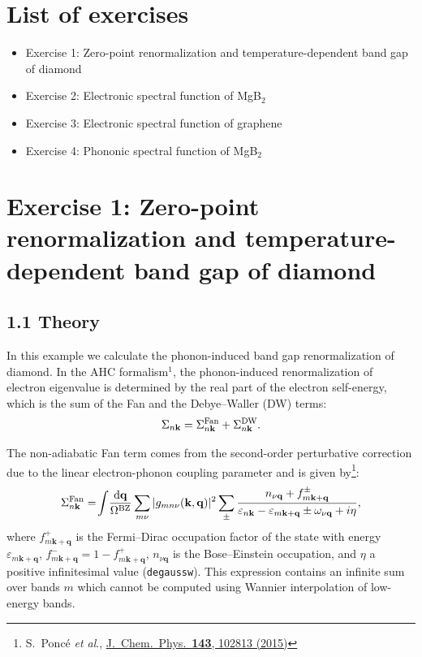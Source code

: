 \documentclass[a4paper,11pt,serif]{article}
\newcommand{\mb}[1]{\mathbf{#1}}
\begin{document}
\section*{List of exercises}
\begin{itemize}
   \item Exercise 1: Zero-point renormalization and temperature-dependent band gap of diamond
   \item Exercise 2: Electronic spectral function of MgB$_2$
   \item Exercise 3: Electronic spectral function of graphene
   \item Exercise 4: Phononic spectral function of MgB$_2$
\end{itemize}


\section*{Exercise 1: Zero-point renormalization and temperature-dependent band gap of diamond}

\subsection*{1.1 Theory}
In this example we calculate the phonon-induced band gap renormalization of diamond.
In the AHC formalism$^{1}$, the phonon-induced renormalization of electron eigenvalue is determined by the real part of the electron self-energy, which is the sum of the Fan and the Debye--Waller (DW) terms:
\begin{equation}
   \Sigma_{n\mb{k}} = \Sigma^{\rm Fan}_{n\mb{k}} + \Sigma^{\rm DW}_{n\mb{k}}.
\end{equation}


\vspace{0.5cm}
The non-adiabatic Fan term comes from the second-order perturbative correction due to the linear electron-phonon coupling parameter and is given by\footnote{S.\ Ponc\'e \textit{et al}., \href{https://pubs.aip.org/aip/jcp/article-abstract/143/10/102813/898920/Temperature-dependence-of-the-electronic-structure?redirectedFrom=fulltext}{J.\ Chem.\ Phys.\ \textbf{143}, 102813 (2015)}}:
\begin{equation}
   \Sigma^{\rm Fan}_{n\mb{k}} = \!\int\! \frac{\mathrm{d}\mathbf{q}}{\Omega^{\mathrm{BZ}}} \sum_{m\nu} | g_{mn\nu}(\mb{k,q})|^2
   \sum_{\pm} \frac{n_{\nu\mb{q}} + f_{m\mb{k}+\mb{q}}^\pm}{\varepsilon_{n\mb{k}} - \varepsilon_{m\mb{k}+\mb{q}} \pm \omega_{\nu\mb{q}} + i\eta},
\end{equation}
where $f_{m\mb{k}+\mb{q}}^+$ is the Fermi--Dirac occupation factor of the state with energy $\varepsilon_{m\mb{k}+\mb{q}}$, $f_{m\mb{k}+\mb{q}}^- = 1 - f_{m\mb{k}+\mb{q}}^+$, $n_{\nu\mathbf{q}}$ is the Bose--Einstein occupation, and $\eta$ a positive infinitesimal value (\texttt{degaussw}).
%
This expression contains an infinite sum over bands $m$ which cannot be computed using Wannier interpolation of low-energy bands.
\end{document}
